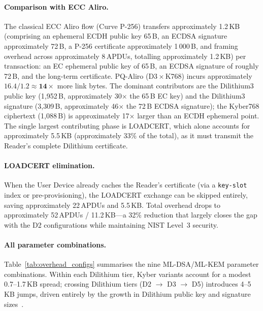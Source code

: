 \documentclass[runningheads]{llncs}
\begin{document}
\paragraph{Comparison with ECC Aliro.}
The classical ECC Aliro flow (Curve P-256) transfers approximately 1.2\,KB (comprising an ephemeral ECDH public key 65\,B, an ECDSA signature approximately 72\,B, a P-256 certificate approximately 1\,000\,B, and framing overhead across approximately 8\,APDUs, totalling approximately 1.2\,KB)
per transaction: an EC ephemeral public key of 65\,B, an ECDSA signature of
roughly 72\,B, and the long-term certificate.  PQ-Aliro (D3\,$\times$\,K768)
incurs approximately $16.4/1.2 \approx \mathbf{14\times}$ more link bytes.
The dominant contributors are the Dilithium3 public key (1{,}952\,B,
approximately 30$\times$ the 65\,B EC key) and the Dilithium3 signature
(3{,}309\,B, approximately 46$\times$ the 72\,B ECDSA signature); the Kyber768
ciphertext (1{,}088\,B) is approximately 17$\times$ larger than an ECDH
ephemeral point.  The single largest contributing phase is LOADCERT, which
alone accounts for approximately 5.5\,KB (approximately 33\% of the total), as
it must transmit the Reader's complete Dilithium certificate.

\paragraph{LOADCERT elimination.}
When the User Device already caches the Reader's certificate (via a
\texttt{key-slot} index or pre-provisioning), the LOADCERT exchange can be
skipped entirely, saving approximately 22\,APDUs and 5.5\,KB.  Total
overhead drops to approximately 52\,APDUs / 11.2\,KB—a 32\% reduction
that largely closes the gap with the D2 configurations while maintaining
NIST Level~3 security.

\paragraph{All parameter combinations.}
Table~\ref{tab:overhead_configs} summarises the nine ML-DSA/ML-KEM parameter
combinations.  Within each Dilithium tier, Kyber variants account for a
modest 0.7–1.7\,KB spread; crossing Dilithium tiers (D2 $\to$ D3 $\to$ D5)
introduces 4–5\,KB jumps, driven entirely by the growth in Dilithium public
key and signature sizes~\cite{NIST:FIPS204}.
\end{document}

